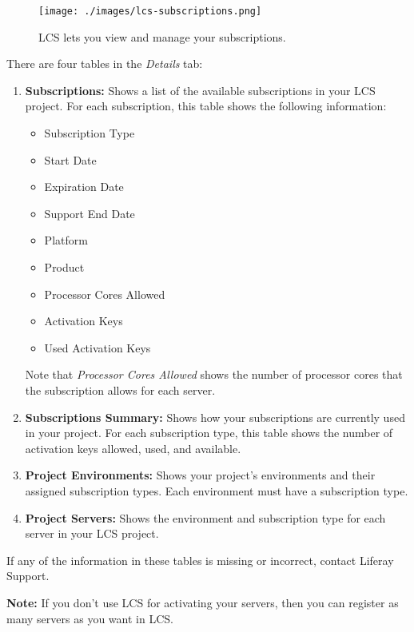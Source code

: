 \begin{figure}
\centering
\texttt{[image: ./images/lcs-subscriptions.png]}
\caption{LCS lets you view and manage your subscriptions.}
\end{figure}

There are four tables in the \emph{Details} tab:

\begin{enumerate}
\def\labelenumi{\arabic{enumi}.}
\item
  \textbf{Subscriptions:} Shows a list of the available subscriptions in
  your LCS project. For each subscription, this table shows the
  following information:

  \begin{itemize}
  \tightlist
  \item
    Subscription Type
  \item
    Start Date
  \item
    Expiration Date
  \item
    Support End Date
  \item
    Platform
  \item
    Product
  \item
    Processor Cores Allowed
  \item
    Activation Keys
  \item
    Used Activation Keys
  \end{itemize}

  Note that \emph{Processor Cores Allowed} shows the number of processor
  cores that the subscription allows for each server.
\item
  \textbf{Subscriptions Summary:} Shows how your subscriptions are
  currently used in your project. For each subscription type, this table
  shows the number of activation keys allowed, used, and available.
\item
  \textbf{Project Environments:} Shows your project's environments and
  their assigned subscription types. Each environment must have a
  subscription type.
\item
  \textbf{Project Servers:} Shows the environment and subscription type
  for each server in your LCS project.
\end{enumerate}

If any of the information in these tables is missing or incorrect,
contact Liferay Support.

\noindent\hrulefill

\textbf{Note:} If you don't use LCS for activating your servers, then
you can register as many servers as you want in LCS.

